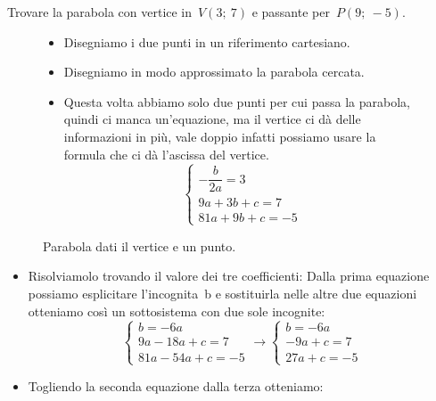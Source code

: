 \begin{esempio}
 Trovare la parabola con vertice in~\(V(3;~7)\) e passante per~\(P(9;~-5)\).
 
\begin{figure}[h!]
\begin{minipage}{.60\textwidth}
 \begin{itemize}
  \item Disegniamo i due punti in un riferimento cartesiano.
  \item Disegniamo in modo approssimato la parabola cercata.
  \item Questa volta abbiamo solo due punti per cui passa la parabola, quindi
   ci manca un'equazione, ma il vertice ci dà delle informazioni in più, 
   vale doppio infatti possiamo usare la formula che ci dà l'ascissa del 
   vertice.
\[\left\{\begin{array}{l}
  -\dfrac{b}{2a}=3\\
  9a+3b+c=7\\
  81a+9b+c=-5
\end{array}\right. \]
 \end{itemize}

\end{minipage}
\begin{minipage}{.40\textwidth}
\begin{inaccessibleblock}[Parabola di equazione \(y=x^2\).]
\centering
\scalebox{.7}{  \parabolaverticepunto}
  \caption{Parabola dati il vertice e un punto.} 
\label{fig:parabola_parabolaverticepunto}
\end{inaccessibleblock}
\end{minipage}
\end{figure}

  \begin{itemize}
  \item Risolviamolo trovando il valore dei tre coefficienti:
   Dalla prima equazione possiamo esplicitare l'incognita~b e sostituirla
   nelle altre due equazioni otteniamo così un sottosistema con due sole 
   incognite:
\[\left\{\begin{array}{l}
  b=-6a \\
  9a-18a+c=7\\
  81a-54a+c=-5
\end{array}\right. \rightarrow 
\left\{\begin{array}{l}
  b=-6a \\
  -9a+c=7\\
  27a+c=-5
\end{array}\right.\]
  \item Togliendo la seconda equazione dalla terza otteniamo: 


\end{itemize}
\end{esempio}
